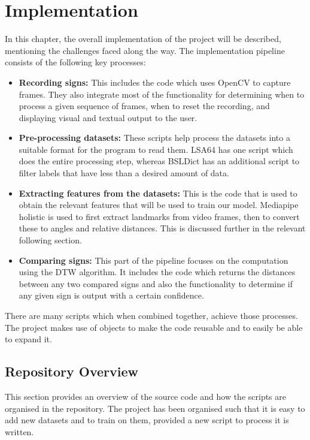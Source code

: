 \documentclass[final,rdr32.tex]{subfiles}
\begin{document}
\chapter{Implementation}

In this chapter, the overall implementation of the project will be described, mentioning the challenges faced along the way. The implementation pipeline consists of the following key processes:

\begin{itemize}
    \item \textbf{Recording signs: }This includes the code which uses OpenCV to capture frames. They also integrate most of the functionality for determining when to process a given sequence of frames, when to reset the recording, and displaying visual and textual output to the user.
    \item \textbf{Pre-processing datasets: }These scripts help process the datasets into a suitable format for the program to read them. LSA64 has one script which does the entire processing step, whereas BSLDict has an additional script to filter labels that have less than a desired amount of data.
    \item \textbf{Extracting features from the datasets: }This is the code that is used to obtain the relevant features that will be used to train our model. Mediapipe holistic is used to first extract landmarks from video frames, then to convert these to angles and relative distances. This is discussed further in the relevant following section.
    \item \textbf{Comparing signs: }This part of the pipeline focuses on the computation using the DTW algorithm. It includes the code which returns the distances between any two compared signs and also the functionality to determine if any given sign is output with a certain confidence.
\end{itemize}

There are many scripts which when combined together, achieve those processes. The project makes use of objects to make the code reusable and to easily be able to expand it.

\section{Repository Overview}

This section provides an overview of the source code and how the scripts are organised in the repository. The project has been organised such that it is easy to add new datasets and to train on them, provided a new script to process it is written.
\bigskip
\end{document}
